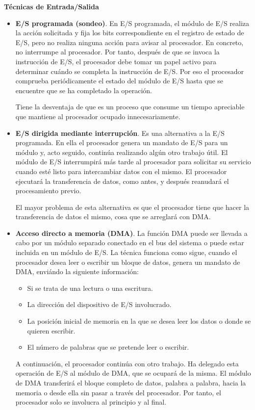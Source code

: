 \documentclass{article}
\begin{document}
\textbf{Técnicas de Entrada/Salida}
\begin{itemize}
\item \textbf{E/S programada (sondeo)}. En E/S programada, el módulo de E/S realiza la acción solicitada y fija los bits correspondiente en el registro de estado de E/S, pero no realiza ninguna acción para avisar al procesador. En concreto, no interrumpe al procesador. Por tanto, después de que se invoca la instrucción de E/S, el procesador debe tomar un papel activo para determinar cuándo se completa la instrucción de E/S. Por eso el procesador comprueba periódicamente el estado del módulo de E/S hasta que se encuentre que se ha completado la operación.

Tiene la desventaja de que es un proceso que consume un tiempo apreciable que mantiene al procesador ocupado innecesariamente.

\item \textbf{E/S dirigida mediante interrupción}. Es una alternativa a la E/S programada. En ella el procesador genera un mandato de E/S para un módulo y, acto seguido, continúa realizando algún otro trabajo útil. El módulo de E/S interrumpirá más tarde al procesador para solicitar su servicio cuando esté listo para intercambiar datos con el mismo. El procesador ejecutará la transferencia de datos, como antes, y después reanudará el procesamiento previo.

El mayor problema de esta alternativa es que el procesador tiene que hacer la transferencia de datos el mismo, cosa que se arreglará con DMA.

\item \textbf{Acceso directo a memoria (DMA)}. La función DMA puede ser llevada a cabo por un módulo separado conectado en el bus del sistema o puede estar incluida en un módulo de E/S. La técnica funciona como sigue, cuando el procesador desea leer o escribir un bloque de datos, genera un mandato de DMA, enviándo la siguiente información:
\begin{itemize}
\item Si se trata de una lectura o una escritura.

\item La dirección del dispositivo de E/S involucrado.

\item La posición inicial de memoria en la que se desea leer los datos o donde se quieren escribir.

\item El número de palabras que se pretende leer o escribir.
\end{itemize}

A continuación, el procesador continúa con otro trabajo. Ha delegado esta operación de E/S al módulo de DMA, que se ocupará de la misma. El módulo de DMA transferirá el bloque completo de datos, palabra a palabra, hacia la memoria o desde ella sin pasar a través del procesador. Por tanto, el procesador solo se involucra al principio y al final.
\end{itemize}
\end{document}
